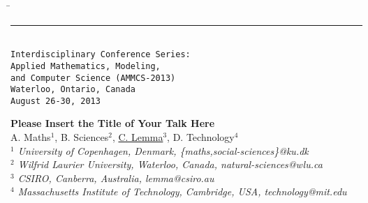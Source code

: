 \documentclass[11pt]{article}
\begin{document}
\thispagestyle{empty}
\begin{tabbing}
\hspace*{4.5in} \= {} \\[-5pt]
\rule{6.8 in}{0.01 in} \\[-2pt]
{ } \> {\footnotesize\tt Interdisciplinary Conference Series:} \\[-5pt]
{} \> {\footnotesize\tt  Applied Mathematics, Modeling,} \\[-5pt]
{} \> {\footnotesize\tt  and Computer Science (AMMCS-2013)} \\[-5pt]
{} \> {\footnotesize\tt  Waterloo, Ontario, Canada} \\[-5pt]
{} \> {\footnotesize\tt  August 26-30, 2013}  \\[-5pt]
\end{tabbing}
%
\vspace{-0.8cm}
\begin{flushleft}
\Large \textbf{\noindent
Please Insert the Title of Your Talk Here}
\\
\vspace{0.5cm}
\normalsize
\normalsize{
 A. Maths$^1$, B. Sciences$^2$, \underline{C. Lemma}$^3$, D. Technology$^4$
} \\
\vspace{5mm}
\textit{\footnotesize
$^1$ University of Copenhagen, Denmark,
\{maths,social-sciences\}@ku.dk\\
$^2$ Wilfrid Laurier University, Waterloo, Canada,
natural-sciences@wlu.ca\\
$^3$ CSIRO, Canberra, Australia,
lemma@csiro.au\\
$^4$ Massachusetts Institute of Technology, Cambridge, USA,
technology@mit.edu\\
}
\end{flushleft}
\end{document}

